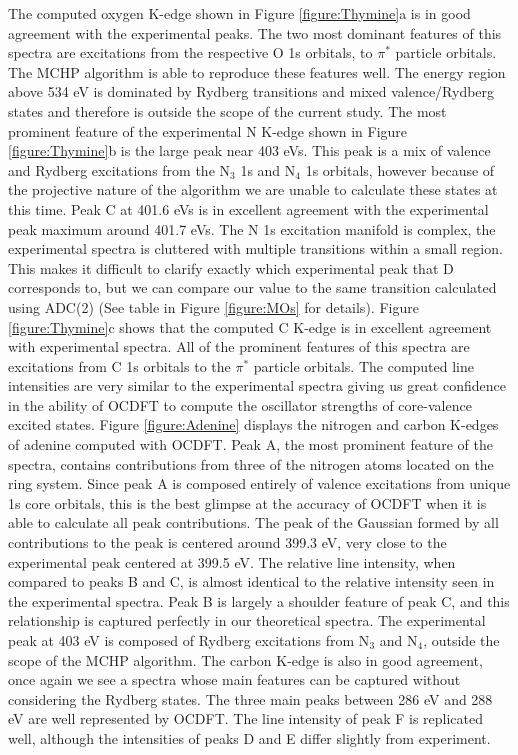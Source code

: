\documentclass[11.5pt]{article}
\begin{document}
\noindent The computed oxygen K-edge shown in Figure \ref{figure:Thymine}a is in good agreement with the experimental peaks. The two most dominant features of this spectra are excitations from the respective O 1s orbitals, to $\pi^*$ particle orbitals. The MCHP algorithm is able to reproduce these features well. The energy region above 534 eV is dominated by Rydberg transitions and mixed valence/Rydberg states and therefore is outside the scope of the current study. The most prominent feature of the experimental N K-edge shown in Figure \ref{figure:Thymine}b is the large peak near 403 eVs. This peak is a mix of valence and Rydberg excitations from the N$_3$ 1s and N$_4$ 1s orbitals, however because of the projective nature of the algorithm we are unable to calculate these states at this time. Peak C at 401.6 eVs is in excellent agreement with the experimental peak maximum around 401.7 eVs. The N 1s excitation manifold is complex, the experimental spectra is cluttered with multiple transitions within a small region. This makes it difficult to clarify exactly which experimental peak that D corresponds to, but we can compare our value to the same transition calculated using ADC(2) (See table in Figure \ref{figure:MOs} for details). Figure \ref{figure:Thymine}c shows that the computed C K-edge is in excellent agreement with experimental spectra. All of the prominent features of this spectra are excitations from C 1s orbitals to the $\pi^*$ particle orbitals. The computed line intensities are very similar to the experimental spectra giving us great confidence in the ability of OCDFT to compute the oscillator strengths of core-valence excited states.
Figure \ref{figure:Adenine} displays the nitrogen and carbon K-edges of adenine computed with OCDFT. Peak A, the most prominent feature of the spectra, contains contributions from three of the nitrogen atoms located on the ring system. Since peak A is composed entirely of valence excitations from unique 1s core orbitals, this is the best glimpse at the accuracy of OCDFT when it is able to calculate all peak contributions. The peak of the Gaussian formed by all contributions to the peak is centered around 399.3 eV, very close to the experimental peak centered at 399.5 eV. The relative line intensity, when compared to peaks B and C, is almost identical to the relative intensity seen in the experimental spectra. Peak B is largely a shoulder feature of peak C, and this relationship is captured perfectly in our theoretical spectra. The experimental peak at 403 eV is composed of Rydberg excitations from N$_3$ and N$_4$, outside the scope of the MCHP algorithm. The carbon K-edge is also in good agreement, once again we see a spectra whose main features can be captured without considering the Rydberg states. The three main peaks between 286 eV and 288 eV are well represented by OCDFT. The line intensity of peak F is replicated well, although the intensities of peaks D and E differ slightly from experiment. \\
\end{document}

